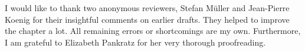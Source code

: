 \documentclass[output=paper,biblatex,babelshorthands,newtxmath,draftmode,colorlinks,citecolor=brown]{langscibook}
\begin{document}
\section*{\acknowledgmentsUS}


I would like to thank two anonymous reviewers, Stefan Müller and Jean-Pierre Koenig for
their insightful comments on earlier drafts. They helped to improve
the chapter a lot. All remaining errors or
shortcomings are my own. Furthermore, I am grateful to Elizabeth
Pankratz for her very thorough proofreading.



\printbibliography[heading=subbibliography,notkeyword=this] 
\end{document}
